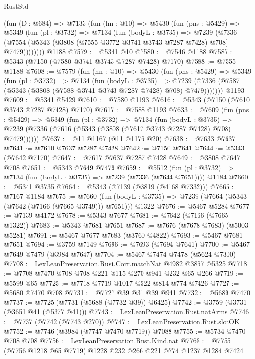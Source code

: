 \begin{lexlean}{RustStd}
\begin{coremodule}
    (fun (D : @684) =>
    @7133
      (fun (hn : @10) =>
      @5430
        (fun (pns : @5429) =>
        @5349
          (fun (pl : @3732) =>
          @7134
            (fun (bodyL : @3735) =>
            @7239
              (@7336 (@7554 (@5343 (@3808 (@7555 @3772 @3741 @3743 @7287 @7428) @708) @7479))))))))
    @1188
@7579 := @5341 @10
@7580 := @7546 @1188
@7587 := @5343 (@7150 (@7580 @3741 @3743 @7287 @7428) @7170)
@7588 := @7555 @1188
@7608 := @7579
    (fun (hn : @10) =>
    @5430
      (fun (pns : @5429) =>
      @5349
        (fun (pl : @3732) =>
        @7134
          (fun (bodyL : @3735) =>
          @7239 (@7336 (@7587 (@5343 (@3808 (@7588 @3741 @3743 @7287 @7428) @708) @7479)))))))
    @1193
@7609 := @5341 @5429
@7610 := @7580 @1193
@7616 := @5343 (@7150 (@7610 @3743 @7287 @7428) @7170)
@7617 := @7588 @1193
@7633 := @7609
    (fun (pns : @5429) =>
    @5349
      (fun (pl : @3732) =>
      @7134
        (fun (bodyL : @3735) =>
        @7239 (@7336 (@7616 (@5343 (@3808 (@7617 @3743 @7287 @7428) @708) @7479))))))
@7637 := @11 @1167 (@11 @1176 @20)
@7638 := @7633 @7637
@7641 := @7610 @7637 @7287 @7428
@7642 := @7150 @7641
@7644 := @5343 (@7642 @7170)
@7647 := @7617 @7637 @7287 @7428
@7649 := @3808 @7647 @708
@7651 := @5343 @7649 @7479
@7659 := @5512
    (fun (pl : @3732) => @7134 (fun (bodyL : @3735) => @7239 (@7336 (@7644 @7651))))
    @1184
@7660 := @5341 @3735
@7664 := @5343 (@7139 (@3819 (@4168 @7332)))
@7665 := @7167 @1184
@7675 := @7660
    (fun (bodyL : @3735) => @7239 (@7664 (@5343 (@7642 (@7166 (@7665 @3749))) @7651)))
    @1322
@7676 := @5467 @5284
@7677 := @7139 @4172
@7678 := @5343 @7677
@7681 := @7642 (@7166 (@7665 @1322))
@7683 := @5343 @7681 @7651
@7687 := @7676 (@7678 @7683) (@5003 @5281)
@7691 := @5467 @7677 @7683 (@3760 @4822)
@7693 := @5467 @7681 @7651
@7694 := @3759 @7149
@7696 := @7693 (@7694 @7641)
@7700 := @5467 @7649 @7479 (@3984 @7647)
@7704 := @5467 @7474 @7478 (@5624 @7300)
@7708 := LexLeanPreservation.Rust.Corr.matchNat @4982 @3867 @5325
@7718 := @7708 @7470 @708 @708 @221 @115 @270 @941 @232 @65 @266
@7719 := @5599 @65
@7725 := @7718 @7719 @1017 @522 @814 @774 @7426
@7727 := @5680 @7470 @708
@7731 := @7727 @39 @31 @39 @941
@7732 := @5689 @7470
@7737 := @7725 (@7731 (@5688 (@7732 @39)) @6425)
@7742 := @3759 (@3731 (@3651 @41 (@5377 @41)))
@7743 := LexLeanPreservation.Rust.natArms
@7746 := @7737 (@7742 (@7743 @270))
@7747 := LexLeanPreservation.Rust.slotOK
@7752 := @7746 (@3984 (@7747 @7470 @7719)) @7088
@7755 := @5734 @7470 @708 @708
@7756 := LexLeanPreservation.Rust.Kind.nat
@7768 := @7755 (@7756 @1218 @65 @7719) @1228 @232 @266 @221 @774 @1237 @1284 @7424

\end{coremodule}
\end{lexlean}
